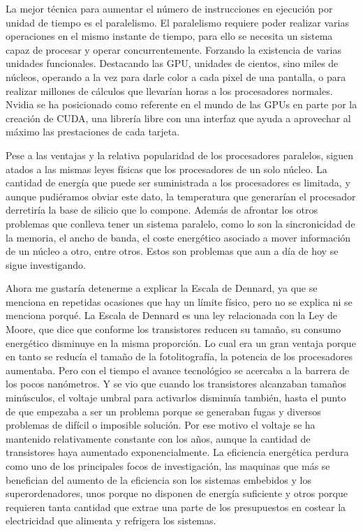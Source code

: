 \documentclass[12pt,a4paper,twoside,openright]{report}
\begin{document}
La mejor técnica para aumentar el número de instrucciones en ejecución por unidad de tiempo es el paralelismo. El paralelismo requiere poder realizar varias operaciones en el mismo instante de tiempo, para ello se necesita un sistema capaz de procesar y operar concurrentemente. Forzando la existencia de varias unidades funcionales.
Destacando las GPU, unidades de cientos, sino miles de núcleos, operando a la vez para darle color a cada pixel de una pantalla, o para realizar millones de cálculos que llevarían horas a los procesadores normales.
Nvidia se ha posicionado como referente en el mundo de las GPUs en parte por la creación de CUDA, una librería libre con una interfaz que ayuda a aprovechar al máximo las prestaciones de cada tarjeta.
\newpage

Pese a las ventajas y la relativa popularidad de los procesadores paralelos, siguen atados a las mismas leyes físicas que los procesadores de un solo núcleo.
La cantidad de energía que puede ser suministrada a los procesadores es limitada, y aunque pudiéramos obviar este dato, la temperatura que generarían el procesador derretiría la base de silicio que lo compone.
Además de afrontar los otros problemas que conlleva tener un sistema paralelo, como lo son la sincronicidad de la memoria, el ancho de banda, el coste energético asociado a mover información de un núcleo a otro, entre otros. Estos son problemas que aun a día de hoy se sigue investigando.
\bigskip

Ahora me gustaría detenerme a explicar la Escala de Dennard, ya que se menciona en repetidas ocasiones que hay un límite físico, pero no se explica ni se menciona porqué. La Escala de Dennard es una ley relacionada con la Ley de Moore, que dice que conforme los transistores reducen su tamaño, su consumo energético disminuye en la misma proporción.
Lo cual era un gran ventaja porque en tanto se reducía el tamaño de la fotolitografía, la potencia de los procesadores aumentaba. Pero con el tiempo el avance tecnológico se acercaba a la barrera de los pocos nanómetros. Y se vio que cuando los transistores alcanzaban tamaños minúsculos, el voltaje umbral para activarlos disminuía también, hasta el punto de que empezaba a ser un problema porque se generaban fugas y diversos problemas de difícil o imposible solución.
Por ese motivo el voltaje se ha mantenido relativamente constante con los años, aunque la cantidad de transistores haya aumentado exponencialmente. La eficiencia energética perdura como uno de los principales focos de investigación, las maquinas que más se benefician del aumento de la eficiencia son los sistemas embebidos y los superordenadores, unos porque no disponen de energía suficiente y otros porque requieren tanta cantidad que extrae una parte de los presupuestos en costear la electricidad que alimenta y refrigera los sistemas. 
\smallskip
\end{document}
